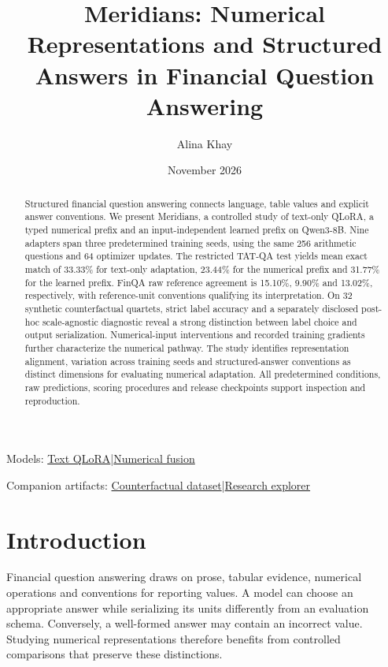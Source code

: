 \documentclass[11pt,a4paper]{article}
\title{Meridians: Numerical Representations and Structured Answers in Financial Question Answering}
\author{Alina Khay}
\date{November 2026}
\begin{document}
\maketitle
\begin{abstract}
Structured financial question answering connects language, table values and explicit answer conventions. We present Meridians, a controlled study of text-only QLoRA, a typed numerical prefix and an input-independent learned prefix on Qwen3-8B. Nine adapters span three predetermined training seeds, using the same 256 arithmetic questions and 64 optimizer updates. The restricted TAT-QA test yields mean exact match of 33.33\% for text-only adaptation, 23.44\% for the numerical prefix and 31.77\% for the learned prefix. FinQA raw reference agreement is 15.10\%, 9.90\% and 13.02\%, respectively, with reference-unit conventions qualifying its interpretation. On 32 synthetic counterfactual quartets, strict label accuracy and a separately disclosed post-hoc scale-agnostic diagnostic reveal a strong distinction between label choice and output serialization. Numerical-input interventions and recorded training gradients further characterize the numerical pathway. The study identifies representation alignment, variation across training seeds and structured-answer conventions as distinct dimensions for evaluating numerical adaptation. All predetermined conditions, raw predictions, scoring procedures and release checkpoints support inspection and reproduction.
\end{abstract}
\begin{center}\small Models: \href{https://huggingface.co/alinakhay/Meridians-8B-Text-QLoRA}{Text QLoRA}\quad|\quad\href{https://huggingface.co/alinakhay/Meridians-8B-Numeric-Fusion}{Numerical fusion}\end{center}
\begin{center}\small Companion artifacts: \href{https://huggingface.co/datasets/alinakhay/Meridians-Counterfactuals}{Counterfactual dataset}\quad|\quad\href{https://huggingface.co/spaces/alinakhay/Meridians-Research-Explorer}{Research explorer}\end{center}
\section{Introduction}
Financial question answering draws on prose, tabular evidence, numerical operations and conventions for reporting values. A model can choose an appropriate answer while serializing its units differently from an evaluation schema. Conversely, a well-formed answer may contain an incorrect value. Studying numerical representations therefore benefits from controlled comparisons that preserve these distinctions.
\end{document}

